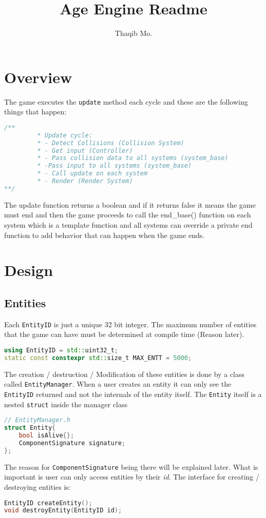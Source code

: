 \documentclass[16pt,a4paper]{article}
\author{Thaqib Mo.}
\title{ Age Engine Readme }
\begin{document}
\section{Overview}
The game executes the \texttt{update} method each cycle and these are the following things that happen:
\begin{lstlisting}[language=c++]
/**
         * Update cycle:
         * - Detect Collisions (Collision System)
         * - Get input (Controller)
         * - Pass collision data to all systems (system_base)
         * -Pass input to all systems (system_base)
         * - Call update on each system 
         * - Render (Render System)
**/ 
\end{lstlisting}
The update function returns a boolean and if it returns false it means the game must end and then the game proceeds to call the end\_base() function on each system which is a template function and all systems can override a private end function to add behavior that can happen when the game ends. 
\section{Design} 
\subsection{Entities}
Each \texttt{EntityID} is just a unique 32 bit integer. The maximum number of entities that the game can have must be determined at compile time (Reason later).   
\begin{lstlisting}[language=c++]
using EntityID = std::uint32_t;
static const constexpr std::size_t MAX_ENTT = 5000;
\end{lstlisting}
The creation / destruction / Modification of these entities is done by a class called \texttt{EntityManager}. When a user creates an entity it can only see the \texttt{EntityID} returned and not the internals of the entity itself. The \texttt{Entity} itself is a nested \texttt{struct} inside the manager class
\begin{lstlisting}[language=c++]
// EntityManager.h
struct Entity{
	bool isAlive{};	
	ComponentSignature signature;
};
\end{lstlisting}
The reason for \texttt{ComponentSignature} being there will be explained later. What is important is user can only access entities by their \textit{id}. The interface for creating / destroying entities is: 
\begin{lstlisting}[language=c++]
EntityID createEntity();
void destroyEntity(EntityID id);
\end{lstlisting}
\end{document}
